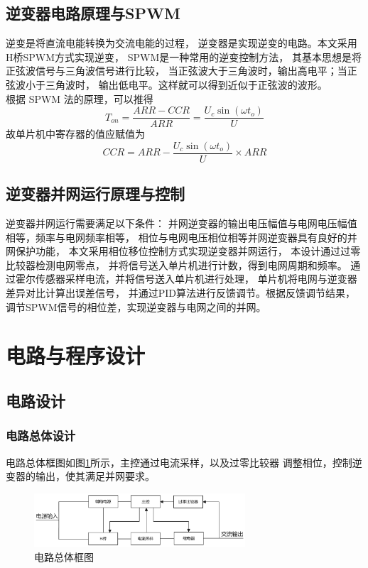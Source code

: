 \documentclass[a4paper,12pt]{article}
\begin{document}
\subsection{逆变器电路原理与SPWM}
逆变是将直流电能转换为交流电能的过程，
逆变器是实现逆变的电路。本文采用H桥SPWM方式实现逆变，
SPWM是一种常用的逆变控制方法，
其基本思想是将正弦波信号与三角波信号进行比较，
当正弦波大于三角波时，输出高电平；当正弦波小于三角波时，
输出低电平。这样就可以得到近似于正弦波的波形。
\\
根据 SPWM 法的原理，可以推得
\begin{equation}
T_{on}=\frac{ARR-CCR}{ARR}=\frac{U_c\sin(\omega t_o)}{U}
\end{equation}
故单片机中寄存器的值应赋值为
\begin{equation}
CCR=ARR-\frac{U_c\sin (\omega t_o)}{U}\times ARR
\end{equation}

\subsection{逆变器并网运行原理与控制}
逆变器并网运行需要满足以下条件：
并网逆变器的输出电压幅值与电网电压幅值相等，频率与电网频率相等，
相位与电网电压相位相等并网逆变器具有良好的并网保护功能，
本文采用相位移位控制方式实现逆变器并网运行，
本设计通过过零比较器检测电网零点，
并将信号送入单片机进行计数，得到电网周期和频率。
通过霍尔传感器采样电流，并将信号送入单片机进行处理，
单片机将电网与逆变器差异对比计算出误差信号，
并通过PID算法进行反馈调节。根据反馈调节结果，
调节SPWM信号的相位差，实现逆变器与电网之间的并网。


\section{电路与程序设计}
\subsection{电路设计}

\subsubsection{电路总体设计}
电路总体框图如图\ref{fig4}所示，主控通过电流采样，以及过零比较器
调整相位，控制逆变器的输出，使其满足并网要求。
\begin{figure}[H]
\centering
\includegraphics[width=0.7\textwidth]{src/fig4.png}
\caption{电路总体框图}
\label{fig4}
\end{figure}
\end{document}
